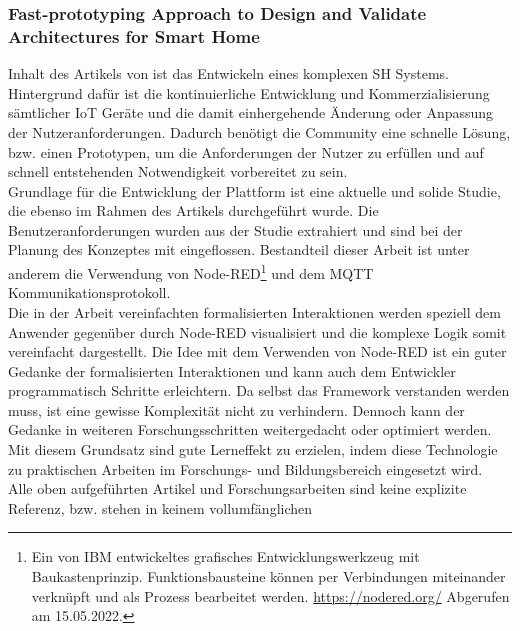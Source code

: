         \subsubsection*{Fast-prototyping Approach to Design and Validate Architectures for Smart Home}  
            Inhalt des Artikels von \cite{Montanaro2021} ist das Entwickeln eines komplexen \acl{SH} Systems. 
            Hintergrund dafür ist die kontinuierliche Entwicklung und Kommerzialisierung sämtlicher \acs{IoT} Geräte und 
            die damit einhergehende Änderung oder Anpassung der Nutzeranforderungen. Dadurch benötigt die Community eine 
            schnelle Lösung, bzw. einen Prototypen, um die Anforderungen der Nutzer zu erfüllen und auf schnell 
            entstehenden Notwendigkeit vorbereitet zu sein. 
            \\
            Grundlage für die Entwicklung der Plattform ist eine aktuelle und solide Studie, die ebenso im Rahmen des 
            Artikels durchgeführt wurde. Die Benutzeranforderungen wurden aus der Studie extrahiert und sind bei der 
            Planung des Konzeptes mit eingeflossen. Bestandteil dieser Arbeit ist unter anderem die Verwendung von Node-RED\footnote{Ein von IBM entwickeltes grafisches Entwicklungswerkzeug mit Baukastenprinzip. Funktionsbausteine können per Verbindungen miteinander verknüpft und als Prozess bearbeitet werden. \url{https://nodered.org/} Abgerufen am 15.05.2022.} und 
            dem \acs{MQTT} Kommunikationsprotokoll. 
            \\
            \linebreak
            Die in der Arbeit vereinfachten formalisierten Interaktionen werden speziell dem Anwender gegenüber durch 
            Node-RED visualisiert und die komplexe Logik somit vereinfacht dargestellt. Die Idee mit dem Verwenden von Node-RED 
            ist ein guter Gedanke der formalisierten Interaktionen und kann auch dem Entwickler programmatisch Schritte 
            erleichtern. Da selbst das Framework verstanden werden muss, ist eine gewisse Komplexität nicht zu verhindern. 
            Dennoch kann der Gedanke in weiteren Forschungsschritten weitergedacht oder optimiert werden. Mit diesem 
            Grundsatz sind gute Lerneffekt zu erzielen, indem diese Technologie zu praktischen Arbeiten im Forschungs- und 
            Bildungsbereich eingesetzt wird. 
    \\
    \linebreak
    Alle oben aufgeführten Artikel und Forschungsarbeiten sind keine explizite Referenz, bzw. stehen in keinem vollumfänglichen 
